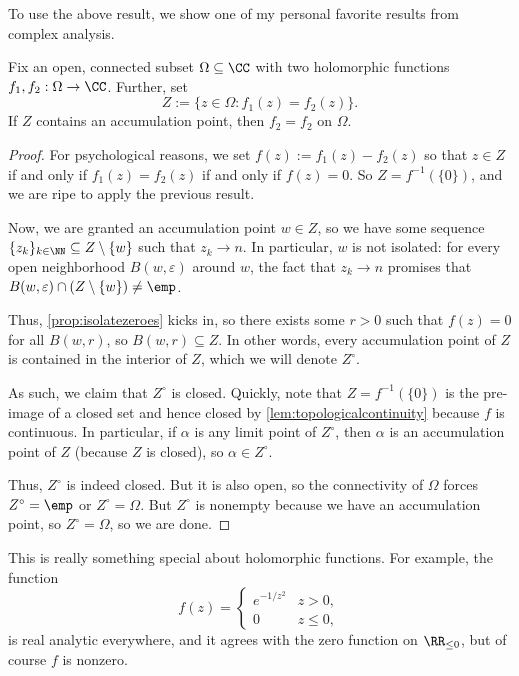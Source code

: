 To use the above result, we show one of my personal favorite results from complex analysis.
\begin{theorem}[Identity]\label{thm:id}
	Fix an open, connected subset $\Omega\subseteq\CC$ with two holomorphic functions $f_1,f_2:\Omega\to\CC$. Further, set
	\[Z:=\{z\in\Omega:f_1(z)=f_2(z)\}.\]
	If $Z$ contains an accumulation point, then $f_2=f_2$ on $\Omega$.
\end{theorem}
\begin{proof}
	For psychological reasons, we set $f(z):=f_1(z)-f_2(z)$ so that $z\in Z$ if and only if $f_1(z)=f_2(z)$ if and only if $f(z)=0$. So $Z=f^{-1}(\{0\})$, and we are ripe to apply the previous result.

	Now, we are granted an accumulation point $w\in Z$, so we have some sequence $\{z_k\}_{k\in\NN}\subseteq Z\setminus\{w\}$ such that $z_k\to n$. In particular, $w$ is not isolated: for every open neighborhood $B(w,\varepsilon)$ around $w$, the fact that $z_k\to n$ promises that $B(w,\varepsilon)\cap(Z\setminus\{w\})\ne\emp$.

	Thus, \autoref{prop:isolatezeroes} kicks in, so there exists some $r>0$ such that $f(z)=0$ for all $B(w,r)$, so $B(w,r)\subseteq Z$. In other words, every accumulation point of $Z$ is contained in the interior of $Z$, which we will denote $Z^\circ$.

	As such, we claim that $Z^\circ$ is closed. Quickly, note that $Z=f^{-1}(\{0\})$ is the pre-image of a closed set and hence closed by \autoref{lem:topologicalcontinuity} because $f$ is continuous.
	In particular, if $\alpha$ is any limit point of $Z^\circ$, then $\alpha$ is an accumulation point of $Z$ (because $Z$ is closed), so $\alpha\in Z^\circ$.

	Thus, $Z^\circ$ is indeed closed. But it is also open, so the connectivity of $\Omega$ forces $Z^\circ=\emp$ or $Z^\circ=\Omega$. But $Z^\circ$ is nonempty because we have an accumulation point, so $Z^\circ=\Omega$, so we are done.
\end{proof}
\begin{remark}
	This is really something special about holomorphic functions. For example, the function
	\[f(z)=\begin{cases}
		e^{-1/z^2} & z>0, \\
		0 & z\le0,
	\end{cases}\]
	is real analytic everywhere, and it agrees with the zero function on $\RR_{\le0}$, but of course $f$ is nonzero.
\end{remark}
